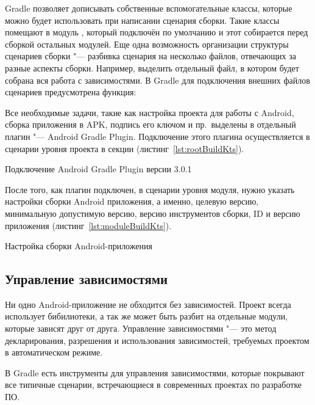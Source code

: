 Gradle позволяет дописывать собственные вспомогательные классы, которые можно будет использовать при написании сценария сборки.
Такие классы помещают в модуль , который подключён по умолчанию и этот собирается перед сборкой остальных модулей.
Еще одна возможность организации структуры сценариев сборки "--- разбивка сценария на несколько файлов, отвечающих за разные аспекты сборки.
Например, выделить отдельный файл, в котором будет собрана вся работа с зависимостями.
В Gradle для подключения внешних файлов сценариев предусмотрена функция:

Все необходимые задачи, такие как настройка проекта для работы с Android, сборка приложения в APK, подпись его ключом и пр.\ выделены в отдельный плагин "--- Android Gradle Plugin.
Подключение этого плагина осуществляется в сценарии уровня проекта в секции  (листинг~\ref{lst:rootBuildKts}).

\begin{listing}[H]
  \caption{Подключение Android Gradle Plugin версии 3.0.1}
  \label{lst:rootBuildKts}
\end{listing}

После того, как плагин подключен, в сценарии уровня модуля, нужно указать настройки сборки Android приложения, а именно, целевую версию, минимальную допустимую версию, версию инструментов сборки, ID и версию приложения (листинг~\ref{lst:moduleBuildKts}).

\begin{listing}[H]
  \caption{Настройка сборки Android-приложения}
  \label{lst:moduleBuildKts}
\end{listing}

\subsection{Управление зависимостями}
\label{subsec:libs}

Ни одно Android-приложение не обходится без зависимостей.
Проект всегда использует бибилиотеки, а так же может быть разбит на отдельные модули, которые зависят друг от друга.
Управление зависимостями "--- это метод декларирования, разрешения и использования зависимостей, требуемых проектом в автоматическом режиме.

В Gradle есть инструменты для управления зависимостями, которые покрывают все типичные сценарии, встречающиеся в современных проектах по разработке ПО\@.


